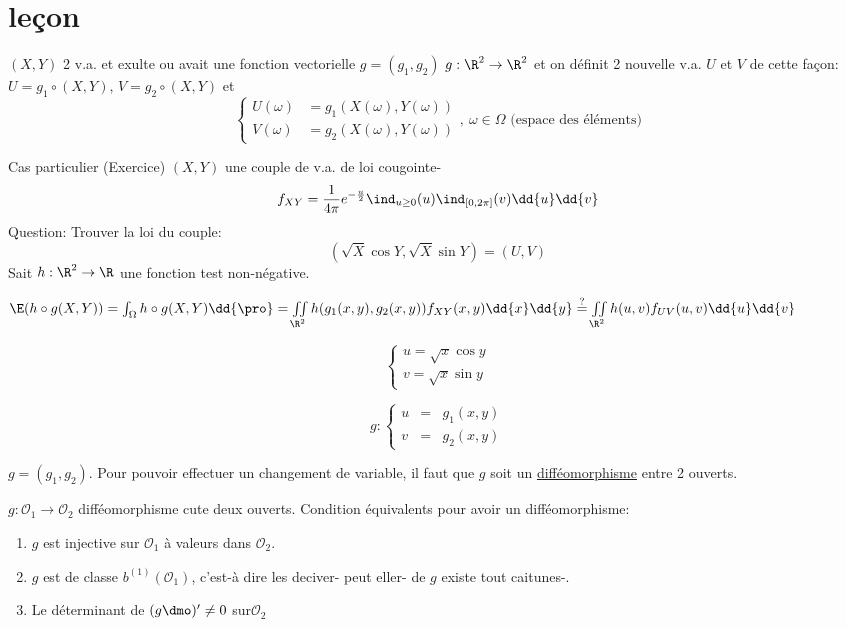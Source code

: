 \section{leçon}

$(X,Y)$ 2 v.a. et exulte ou avait une fonction vectorielle $g=(g_1,g_2)$ $g:\R^2\rightarrow\R^2$ et on définit 2 nouvelle v.a. $U$ et $V$ de cette façon:
$U=g_1\circ (X,Y)$, $V=g_2\circ (X,Y)$ et
$$\left\{\begin{array}{ccc}U(\omega)&=g_1(X(\omega),Y(\omega))\\V(\omega)&=g_2(X(\omega),Y(\omega))\end{array}\right.,\ \omega\in\Omega\text{ (espace des éléments)}$$


Cas particulier (Exercice)
$(X,Y)$ une couple de v.a. de loi  cougointe-
$$f_{XY}=\frac1{4\pi}e^{-\frac u2}\ind_{u\geq 0}(u)\ind_{[0,2\pi]}(v)\dd{u}\dd{v}$$
Question: Trouver la loi du couple:
$$(\sqrt{X}\cos Y, \sqrt X\sin Y)=(U,V)$$
Sait $h:\R^2\rightarrow \R$ une fonction test non-négative.

$\E(h\circ g(X,Y))=\int_\Omega h\circ g(X,Y)\dd{\pro}=\iint\limits_{\R^2}h(g_1(x,y), g_2(x,y))f_{XY}(x,y)\dd{x} \dd{y}\overset{?}{=}\iint\limits_{\R^2}h(u,v)f_{UV}(u,v)\dd{u} \dd{v}$

$$\left\{\begin{array}{ccc}u=\sqrt x \cos y\\ v=\sqrt x \sin y\end{array}\right.$$

$$g: \left\{ \begin{array}{ccc}u&=&g_1(x,y)\\v&=&g_2(x,y)\end{array} \right.$$

$g=(g_1,g_2)$. Pour pouvoir effectuer un changement de variable, il faut que $g$ soit un \underline{difféomorphisme} entre 2 ouverts.

$g:\mathcal O_1\rightarrow \mathcal O_2$ difféomorphisme cute deux ouverts. Condition équivalents pour avoir un difféomorphisme:
\begin{enumerate}
	\item $g$ est injective sur $\mathcal O_1$ à valeurs dans $\mathcal O_2$.
	\item $g$ est de classe $b^{(1)}(\mathcal O_1)$, c'est-à dire les deciver- peut eller- de $g$ existe tout caitunes-.
	\item Le déterminant de $(g\dmo)'\neq 0$ sur$\mathcal O_2$
\end{enumerate}

